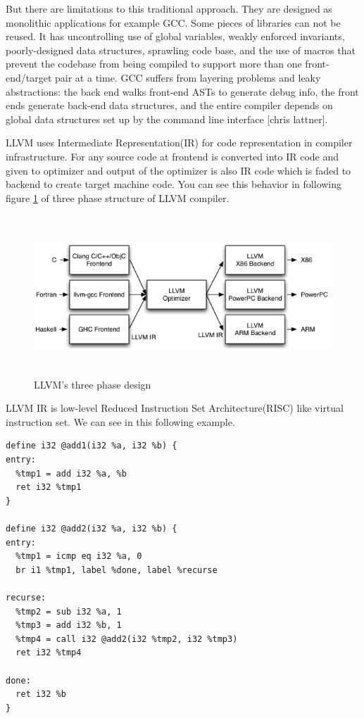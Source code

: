 \par  But there are limitations to this traditional approach. They are designed as monolithic applications for example GCC. Some pieces of libraries can not be reused. It has uncontrolling use of global variables, weakly enforced invariants, poorly-designed data structures, sprawling code base, and the use of macros that prevent the codebase from being compiled to support more than one front-end/target pair at a time. GCC suffers from layering problems and leaky abstractions: the back end walks front-end ASTs to generate debug info, the front ends generate back-end data structures, and the entire compiler depends on global data structures set up by the command line interface [chris lattner]. 

\par LLVM uses Intermediate Representation(IR) for code representation in compiler infrastructure. For any source code at frontend is converted into IR code and given to optimizer and output of the optimizer is also IR code which is faded to backend to create target machine code. You can see this behavior in following figure \ref{fig:llvm} of three phase structure of LLVM compiler. 

\begin{figure}[h!]
\includegraphics[width=12cm, height=6cm]{./images/llvm}
\centering
\caption{LLVM's three phase design}
\label{fig:llvm}
\end{figure}

LLVM IR is low-level Reduced Instruction Set Architecture(RISC) like virtual instruction set. We can see in this following example. 

\begin{lstlisting}
define i32 @add1(i32 %a, i32 %b) {
entry:
  %tmp1 = add i32 %a, %b
  ret i32 %tmp1
}

define i32 @add2(i32 %a, i32 %b) {
entry:
  %tmp1 = icmp eq i32 %a, 0
  br i1 %tmp1, label %done, label %recurse

recurse:
  %tmp2 = sub i32 %a, 1
  %tmp3 = add i32 %b, 1
  %tmp4 = call i32 @add2(i32 %tmp2, i32 %tmp3)
  ret i32 %tmp4

done:
  ret i32 %b
}
\end{lstlisting}

